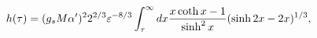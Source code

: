 \begin{equation}\label{KSh}
h(\tau) = (g_s M\alpha')^2 2^{2/3} \varepsilon^{-8/3}\int_\tau^\infty d x {x\coth x-1\over \sinh^2 x} (\sinh 2x - 2x)^{1/3}, 
\end{equation}

